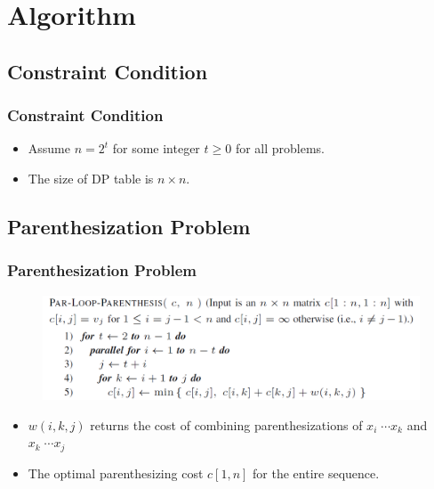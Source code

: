 \section{Algorithm}

\subsection{Constraint Condition}
\begin{frame}
    \frametitle{Constraint Condition}
    \begin{itemize}
		\item Assume $n = 2^t$ for some integer $t \ge 0$ for all problems.
		\item The size of DP table is $n \times n$.
	\end{itemize}
\end{frame}

\subsection{Parenthesization Problem}
\begin{frame}
    \frametitle{Parenthesization Problem}
    \begin{figure}
		\includegraphics[scale=0.4]{figure/fig-parenthesis.png}
	\end{figure}
    \begin{itemize}
    	\item $w(i, k, j)$ returns the cost of combining parenthesizations of
    		$x_i \; \cdots x_k$ and $x_k \; \cdots x_j$
    	\item The optimal parenthesizing cost $c[1, n]$ for the entire sequence.
    \end{itemize}
\end{frame}

